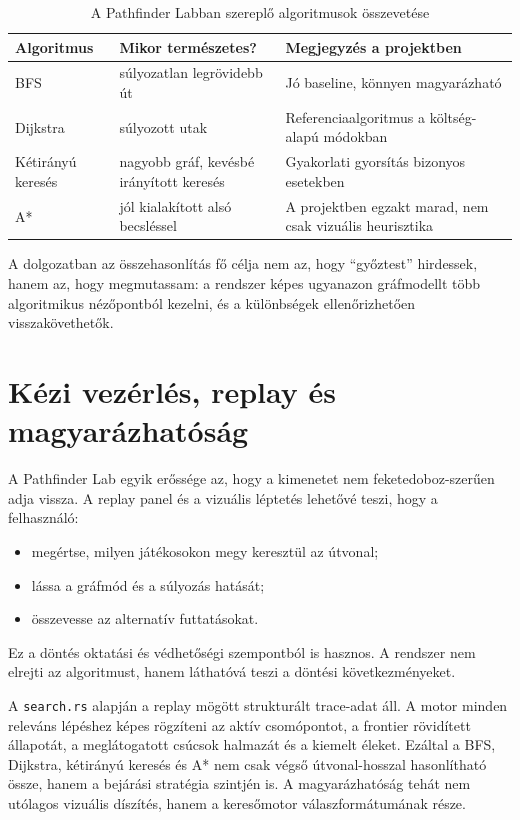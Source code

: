 \documentclass[a4paper,12pt]{report}
\begin{document}
\begin{table}[H]
\centering
\caption{A Pathfinder Labban szereplő algoritmusok összevetése}
\begin{tabularx}{\textwidth}{>{\raggedright\arraybackslash}p{2.8cm} >{\raggedright\arraybackslash}p{2.8cm} X}
\toprule
\textbf{Algoritmus} & \textbf{Mikor természetes?} & \textbf{Megjegyzés a projektben} \\
\midrule
BFS & súlyozatlan legrövidebb út & Jó baseline, könnyen magyarázható \\
Dijkstra & súlyozott utak & Referenciaalgoritmus a költség-alapú módokban \\
Kétirányú keresés & nagyobb gráf, kevésbé irányított keresés & Gyakorlati gyorsítás bizonyos esetekben \\
A* & jól kialakított alsó becsléssel & A projektben egzakt marad, nem csak vizuális heurisztika \\
\bottomrule
\end{tabularx}
\end{table}

A dolgozatban az összehasonlítás fő célja nem az, hogy ``győztest'' hirdessek, hanem az, hogy megmutassam: a rendszer képes ugyanazon gráfmodellt több algoritmikus nézőpontból kezelni, és a különbségek ellenőrizhetően visszakövethetők.

\section{Kézi vezérlés, replay és magyarázhatóság}

A Pathfinder Lab egyik erőssége az, hogy a kimenetet nem feketedoboz-szerűen adja vissza. A replay panel és a vizuális léptetés lehetővé teszi, hogy a felhasználó:

\begin{itemize}
    \item megértse, milyen játékosokon megy keresztül az útvonal;
    \item lássa a gráfmód és a súlyozás hatását;
    \item összevesse az alternatív futtatásokat.
\end{itemize}

Ez a döntés oktatási és védhetőségi szempontból is hasznos. A rendszer nem elrejti az algoritmust, hanem láthatóvá teszi a döntési következményeket.

A \texttt{search.rs} alapján a replay mögött strukturált trace-adat áll. A motor minden releváns lépéshez képes rögzíteni az aktív csomópontot, a frontier rövidített állapotát, a meglátogatott csúcsok halmazát és a kiemelt éleket. Ezáltal a BFS, Dijkstra, kétirányú keresés és A* nem csak végső útvonal-hosszal hasonlítható össze, hanem a bejárási stratégia szintjén is. A magyarázhatóság tehát nem utólagos vizuális díszítés, hanem a keresőmotor válaszformátumának része.
\end{document}
